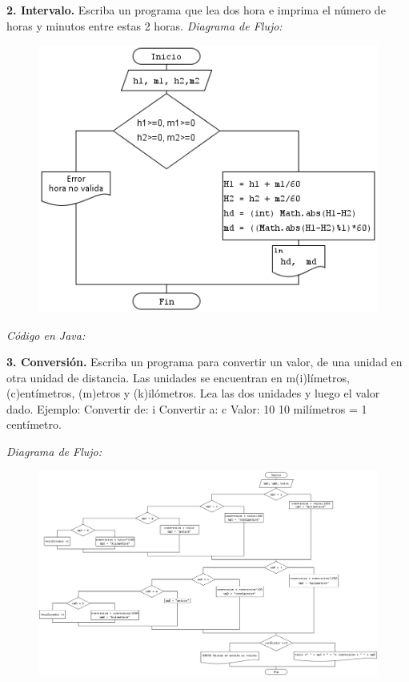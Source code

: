 \documentclass[12pt]{article}
\begin{document}
\textbf{2. Intervalo.} Escriba un programa que lea dos hora e imprima el número de horas y minutos entre estas 2 horas.  
\textit{Diagrama de Flujo:  }
\begin{figure}[h!]
\centering
	\includegraphics[scale=0.6]{dicor/Intervalo.png}    
\end{figure}

\textit{Código en Java:}

\newpage



\textbf{3. Conversión.} Escriba un programa para convertir un valor, de una unidad en otra unidad 
de distancia. Las unidades se encuentran en m(i)límetros, (c)entímetros, (m)etros y
(k)ilómetros. Lea las dos unidades y luego el valor dado. Ejemplo:
Convertir de: i
Convertir a: c
Valor: 10
10 milímetros = 1 centímetro.

\textit{Diagrama de Flujo:  }
\begin{figure}[h!]
\centering
	\includegraphics[scale=0.35]{dicor/Conversion.png}    
\end{figure}
\end{document}

